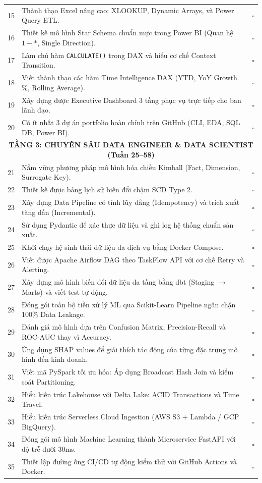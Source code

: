 \begin{longtable}{|c|p{12.5cm}|c|}
15 & Thành thạo Excel nâng cao: XLOOKUP, Dynamic Arrays, và Power Query ETL. & $\square$ \\
16 & Thiết kế mô hình Star Schema chuẩn mực trong Power BI (Quan hệ $1-*$, Single Direction). & $\square$ \\
17 & Làm chủ hàm \texttt{CALCULATE()} trong DAX và hiểu cơ chế Context Transition. & $\square$ \\
18 & Viết thành thạo các hàm Time Intelligence DAX (YTD, YoY Growth \%, Rolling Average). & $\square$ \\
19 & Xây dựng được Executive Dashboard 3 tầng phục vụ trực tiếp cho ban lãnh đạo. & $\square$ \\
20 & Có ít nhất 3 dự án portfolio hoàn chỉnh trên GitHub (CLI, EDA, SQL DB, Power BI). & $\square$ \\
\hline
\multicolumn{3}{|c|}{\textbf{TẦNG 3: CHUYÊN SÂU DATA ENGINEER \& DATA SCIENTIST (Tuần 25--58)}} \\
\hline
21 & Nắm vững phương pháp mô hình hóa chiều Kimball (Fact, Dimension, Surrogate Key). & $\square$ \\
22 & Thiết kế được bảng lịch sử biến đổi chậm SCD Type 2. & $\square$ \\
23 & Xây dựng Data Pipeline có tính lũy đẳng (Idempotency) và trích xuất tăng dần (Incremental). & $\square$ \\
24 & Sử dụng Pydantic để xác thực dữ liệu và ghi log hệ thống chuẩn sản xuất. & $\square$ \\
25 & Khởi chạy hệ sinh thái dữ liệu đa dịch vụ bằng Docker Compose. & $\square$ \\
26 & Viết được Apache Airflow DAG theo TaskFlow API với cơ chế Retry và Alerting. & $\square$ \\
27 & Xây dựng mô hình biến đổi dữ liệu đa tầng bằng dbt (Staging $\rightarrow$ Marts) và viết test tự động. & $\square$ \\
28 & Đóng gói toàn bộ tiền xử lý ML qua Scikit-Learn Pipeline ngăn chặn 100\% Data Leakage. & $\square$ \\
29 & Đánh giá mô hình dựa trên Confusion Matrix, Precision-Recall và ROC-AUC thay vì Accuracy. & $\square$ \\
30 & Ứng dụng SHAP values để giải thích tác động của từng đặc trưng mô hình đến kinh doanh. & $\square$ \\
31 & Viết mã PySpark tối ưu hóa: Áp dụng Broadcast Hash Join và kiểm soát Partitioning. & $\square$ \\
32 & Hiểu kiến trúc Lakehouse với Delta Lake: ACID Transactions và Time Travel. & $\square$ \\
33 & Hiểu kiến trúc Serverless Cloud Ingestion (AWS S3 + Lambda / GCP BigQuery). & $\square$ \\
34 & Đóng gói mô hình Machine Learning thành Microservice FastAPI với độ trễ dưới 30ms. & $\square$ \\
35 & Thiết lập đường ống CI/CD tự động kiểm thử với GitHub Actions và Docker. & $\square$ \\
\hline
\end{longtable}


